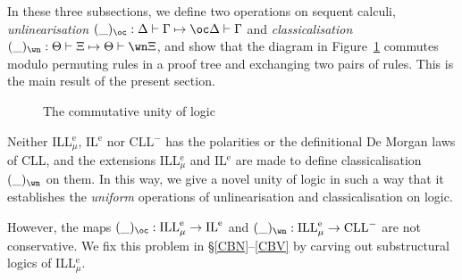 \documentclass[a4paper]{article}
\theoremstyle{definition}
\theoremstyle{theorem}
\theoremstyle{remark}
\begin{document}
In these three subsections, we define two operations on sequent calculi, \emph{unlinearisation} $(\_)_{\oc} : \Delta \vdash \Gamma \mapsto \oc \Delta \vdash \Gamma$ and \emph{classicalisation} $(\_)_{\wn} : \Theta \vdash \Xi \mapsto \Theta \vdash \wn \Xi$, and show that the diagram in Figure~\ref{FigCommutativeUnityOfLogic} commutes modulo permuting rules in a proof tree and exchanging two pairs of rules.
This is the main result of the present section.
\begin{figure}[h]
\caption{The commutative unity of logic}
\label{FigCommutativeUnityOfLogic}
\end{figure}

Neither ILL$^{\text{e}}_{\mu}$, IL$^{\text{e}}$ nor CLL$^-$ has the polarities or the definitional De Morgan laws of CLL, and the extensions ILL$^{\text{e}}_{\mu}$ and IL$^{\text{e}}$ are made to define classicalisation $(\_)_\wn$ on them.
In this way, we give a novel unity of logic in such a way that it establishes the \emph{uniform} operations of unlinearisation and classicalisation on logic. %


However, the maps $(\_)_\oc : \text{ILL}^{\text{e}}_\mu \rightarrow \text{IL}^{\text{e}}$ and $(\_)_\wn : \text{ILL}^{\text{e}}_\mu \rightarrow \text{CLL}^-$ are not conservative.
We fix this problem in \S\ref{CBN}--\ref{CBV} by carving out substructural logics of ILL$^{\text{e}}_\mu$.
\fi
\end{document}
